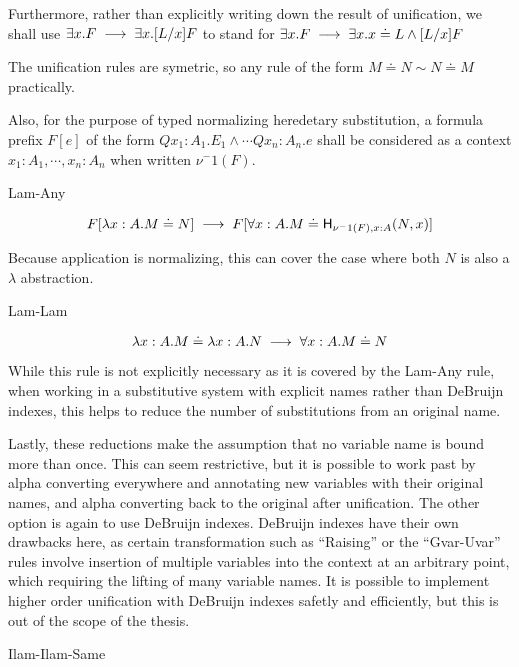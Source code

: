 Furthermore, rather than explicitly writing down the result of unification, 
we shall use $\exists x. F \;\longrightarrow\; \exists x . [ L / x] F$ 
to stand for $\exists x. F \;\longrightarrow\; \exists x . x \doteq L \wedge [ L / x] F$

The unification rules are symetric, so any rule of the form 
$M \doteq N \sim N \doteq M$ practically.

Also, for the purpose of typed normalizing heredetary substitution, 
a formula prefix $F[e]$ of the form 
$Qx_1:A_1 . E_1\wedge \cdots Qx_n : A_n . e$ shall be considered as a context
$x_1 : A_1 ,\cdots ,x_n : A_n$ when written $\nu^-1(F)$.

\setcounter{tcase}{0}

\begin{tcase}
Lam-Any
\end{tcase}

\[
F[\lambda x : A . M \doteq N]
\;\longrightarrow\;
F[\forall x : A . M \doteq \mathsf{H}_{\nu^-1(F),x:A}(N , x)]
\]

Because application is normalizing, this can cover the case where both $N$ is also a $\lambda$ 
abstraction.

\begin{tcase}
Lam-Lam
\end{tcase}

\[
\lambda x : A . M \doteq \lambda x : A . N
\;\longrightarrow\;
\forall x : A . M \doteq N
\]

While this rule is not explicitly necessary as it is covered by the Lam-Any rule, 
when working
in a substitutive system with explicit names rather than DeBruijn indexes, 
this helps to reduce the number of substitutions from an original name. 

Lastly, these reductions make the 
assumption that no variable name is bound more than once.
This can seem restrictive, but it is possible to 
work past by alpha converting everywhere and annotating
new variables with their original names, and alpha converting
back to the original after unification. The other option is again
to use DeBruijn indexes.  DeBruijn indexes have their own drawbacks
here, as certain transformation such as ``Raising''
or the ``Gvar-Uvar'' rules involve insertion of multiple
variables into the context at an arbitrary point, 
which requiring the lifting of many variable names.  
It is possible to implement higher order unification
with DeBruijn indexes safetly and efficiently, 
but this is out of the scope of the thesis.

\begin{tcase}
Ilam-Ilam-Same
\end{tcase}

